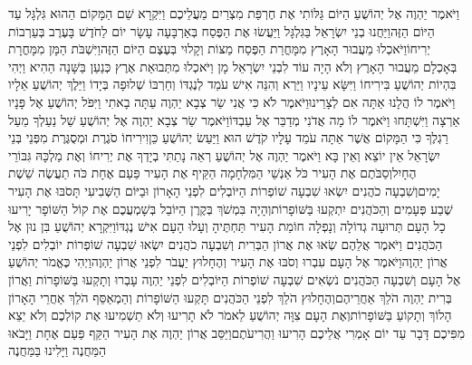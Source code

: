 \documentclass[../main/main.tex]{subfiles}
\begin{document}
\begin{multicols*}{\ncols}
וַיֹּאמֶר יַהְוֶה אֶל יְהוֹשֻׁעַ הַיּוֹם גַּלּוֹתִי אֶת חֶרְפַּת מִצְרַיִם מֵעֲלֵיכֶם וַיִּקְרָא שֵׁם הַמָּקוֹם הַהוּא גִּלְגָּל עַד הַיּוֹם הַזֶּה\PreVerseSpace{}וַיַּחֲנוּ בְנֵי יִשְׂרָאֵל בַּגִּלְגָּל וַיַּעֲשׂוּ אֶת הַפֶּסַח בְּאַרְבָּעָה עָשָׂר יוֹם לַחֹדֶשׁ בָּעֶרֶב בְּעַרְבוֹת יְרִיחוֹ\PreVerseSpace{}וַיֹּאכְלוּ מֵעֲבוּר הָאָרֶץ מִמָּחֳרַת הַפֶּסַח מַצּוֹת וְקָלוּי בְּעֶצֶם הַיּוֹם הַזֶּה\PreVerseSpace{}וַיִּשְׁבֹּת הַמָּן מִמָּחֳרָת בְּאָכְלָם מֵעֲבוּר הָאָרֶץ וְלֹא הָיָה עוֹד לִבְנֵי יִשְׂרָאֵל מָן וַיֹּאכְלוּ מִתְּבוּאַת אֶרֶץ כְּנַעַן בַּשָּׁנָה הַהִיא \ClosedSection{}וַיְהִי בִּהְיוֹת יְהוֹשֻׁעַ בִּירִיחוֹ וַיִּשָּׂא עֵינָיו וַיַּרְא וְהִנֵּה אִישׁ עֹמֵד לְנֶגְדּוֹ וְחַרְבּוֹ שְׁלוּפָה בְּיָדוֹ וַיֵּלֶךְ יְהוֹשֻׁעַ אֵלָיו וַיֹּאמֶר לוֹ הֲלָנוּ אַתָּה אִם לְצָרֵינוּ\PreVerseSpace{}וַיֹּאמֶר לֹא כִּי אֲנִי שַׂר צְבָא יַהְוֶה עַתָּה בָאתִי וַיִּפֹּל יְהוֹשֻׁעַ אֶל פָּנָיו אַרְצָה וַיִּשְׁתָּחוּ וַיֹּאמֶר לוֹ מָה אֲדֹנִי מְדַבֵּר אֶל עַבְדּוֹ\PreVerseSpace{}וַיֹּאמֶר שַׂר צְבָא יַהְוֶה אֶל יְהוֹשֻׁעַ שַׁל נַעַלְךָ מֵעַל רַגְלֶךָ כִּי הַמָּקוֹם אֲשֶׁר אַתָּה עֹמֵד עָלָיו קֹדֶשׁ הוּא וַיַּעַשׂ יְהוֹשֻׁעַ כֵּן\PreChapterSpace{}וִירִיחוֹ סֹגֶרֶת וּמְסֻגֶּרֶת מִפְּנֵי בְּנֵי יִשְׂרָאֵל אֵין יוֹצֵא וְאֵין בָּא \ClosedSection{}וַיֹּאמֶר יַהְוֶה אֶל יְהוֹשֻׁעַ רְאֵה נָתַתִּי בְיָדְךָ אֶת יְרִיחוֹ וְאֶת מַלְכָּהּ גִּבּוֹרֵי הֶחָיִל\PreVerseSpace{}וְסַבֹּתֶם אֶת הָעִיר כֹּל אַנְשֵׁי הַמִּלְחָמָה הַקֵּיף אֶת הָעִיר פַּעַם אֶחָת כֹּה תַעֲשֶׂה שֵׁשֶׁת יָמִים\PreVerseSpace{}וְשִׁבְעָה כֹהֲנִים יִשְׂאוּ שִׁבְעָה שׁוֹפְרוֹת הַיּוֹבְלִים לִפְנֵי הָאָרוֹן וּבַיּוֹם הַשְּׁבִיעִי תָּסֹבּוּ אֶת הָעִיר שֶׁבַע פְּעָמִים וְהַכֹּהֲנִים יִתְקְעוּ בַּשּׁוֹפָרוֹת\PreVerseSpace{}וְהָיָה בִּמְשֹׁךְ בְּקֶרֶן הַיּוֹבֵל בְּשָׁמְעֲכֶם אֶת קוֹל הַשּׁוֹפָר יָרִיעוּ כָל הָעָם תְּרוּעָה גְדוֹלָה וְנָפְלָה חוֹמַת הָעִיר תַּחְתֶּיהָ וְעָלוּ הָעָם אִישׁ נֶגְדּוֹ\PreVerseSpace{}וַיִּקְרָא יְהוֹשֻׁעַ בִּן נוּן אֶל הַכֹּהֲנִים וַיֹּאמֶר אֲלֵהֶם שְׂאוּ אֶת אֲרוֹן הַבְּרִית וְשִׁבְעָה כֹהֲנִים יִשְׂאוּ שִׁבְעָה שׁוֹפְרוֹת יוֹבְלִים לִפְנֵי אֲרוֹן יַהְוֶה\PreVerseSpace{}וַיֹּאמֶר\SubEnd{} אֶל הָעָם עִבְרוּ וְסֹבּוּ אֶת הָעִיר וְהֶחָלוּץ יַעֲבֹר לִפְנֵי אֲרוֹן יַהְוֶה\PreVerseSpace{}וַיְהִי כֶּאֱמֹר יְהוֹשֻׁעַ אֶל הָעָם וְשִׁבְעָה הַכֹּהֲנִים נֹשְׂאִים שִׁבְעָה שׁוֹפְרוֹת הַיּוֹבְלִים לִפְנֵי יַהְוֶה עָבְרוּ וְתָקְעוּ בַּשּׁוֹפָרוֹת וַאֲרוֹן בְּרִית יַהְוֶה הֹלֵךְ אַחֲרֵיהֶם\PreVerseSpace{}וְהֶחָלוּץ הֹלֵךְ לִפְנֵי הַכֹּהֲנִים תָּקְעוּ הַשּׁוֹפָרוֹת וְהַמְאַסֵּף הֹלֵךְ אַחֲרֵי הָאָרוֹן הָלוֹךְ וְתָקוֹעַ בַּשּׁוֹפָרוֹת\PreVerseSpace{}וְאֶת הָעָם צִוָּה יְהוֹשֻׁעַ לֵאמֹר לֹא תָרִיעוּ וְלֹא תַשְׁמִיעוּ אֶת קוֹלְכֶם וְלֹא יֵצֵא מִפִּיכֶם דָּבָר עַד יוֹם אָמְרִי אֲלֵיכֶם הָרִיעוּ וַהֲרִיעֹתֶם\PreVerseSpace{}וַיַּסֵּב אֲרוֹן יַהְוֶה אֶת הָעִיר הַקֵּף פַּעַם אֶחָת וַיָּבֹאוּ הַמַּחֲנֶה וַיָּלִינוּ בַּמַּחֲנֶה\OpenSection{}\par

\end{multicols*}
\end{document}

